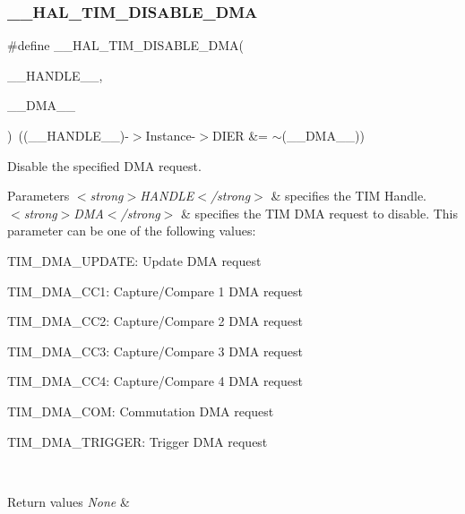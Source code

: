 \subsubsection{\texorpdfstring{\_\_HAL\_TIM\_DISABLE\_DMA}{\_\_HAL\_TIM\_DISABLE\_DMA}}
{\footnotesize\ttfamily \#define \+\_\+\+\_\+\+H\+A\+L\+\_\+\+T\+I\+M\+\_\+\+D\+I\+S\+A\+B\+L\+E\+\_\+\+D\+MA(\begin{DoxyParamCaption}\item[{}]{\+\_\+\+\_\+\+H\+A\+N\+D\+L\+E\+\_\+\+\_\+,  }\item[{}]{\+\_\+\+\_\+\+D\+M\+A\+\_\+\+\_\+ }\end{DoxyParamCaption})~((\+\_\+\+\_\+\+H\+A\+N\+D\+L\+E\+\_\+\+\_\+)-\/$>$Instance-\/$>$D\+I\+ER \&= $\sim$(\+\_\+\+\_\+\+D\+M\+A\+\_\+\+\_\+))}



Disable the specified D\+MA request. 


\begin{DoxyParams}{Parameters}
{\em $<$strong$>$\+H\+A\+N\+D\+L\+E$<$/strong$>$} & specifies the T\+IM Handle. \\
\hline
{\em $<$strong$>$\+D\+M\+A$<$/strong$>$} & specifies the T\+IM D\+MA request to disable. This parameter can be one of the following values\+: \begin{DoxyItemize}
\item T\+I\+M\+\_\+\+D\+M\+A\+\_\+\+U\+P\+D\+A\+TE\+: Update D\+MA request \item T\+I\+M\+\_\+\+D\+M\+A\+\_\+\+C\+C1\+: Capture/\+Compare 1 D\+MA request \item T\+I\+M\+\_\+\+D\+M\+A\+\_\+\+C\+C2\+: Capture/\+Compare 2 D\+MA request \item T\+I\+M\+\_\+\+D\+M\+A\+\_\+\+C\+C3\+: Capture/\+Compare 3 D\+MA request \item T\+I\+M\+\_\+\+D\+M\+A\+\_\+\+C\+C4\+: Capture/\+Compare 4 D\+MA request \item T\+I\+M\+\_\+\+D\+M\+A\+\_\+\+C\+OM\+: Commutation D\+MA request \item T\+I\+M\+\_\+\+D\+M\+A\+\_\+\+T\+R\+I\+G\+G\+ER\+: Trigger D\+MA request \end{DoxyItemize}
\\
\hline
\end{DoxyParams}

\begin{DoxyRetVals}{Return values}
{\em None} & \\
\hline
\end{DoxyRetVals}
\mbox{\label{group___t_i_m___exported___macros_ga31d67e905bc62e3142179dc4bbf8ba64}} 
